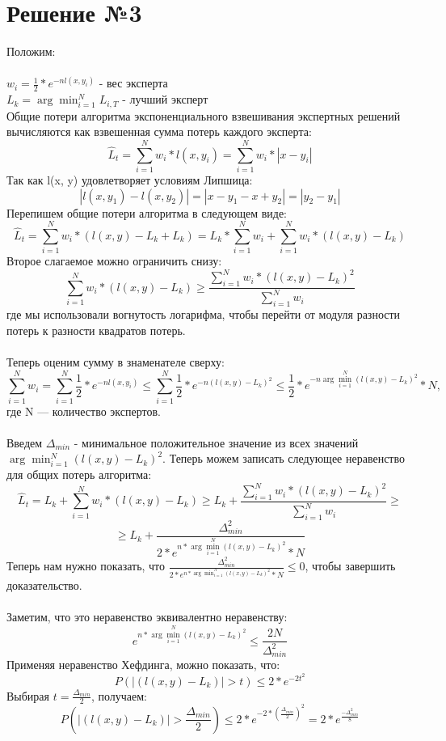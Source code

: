 \documentclass{article}
\begin{document}
\section{Решение №3}

Положим: \\\\
$w_i=\frac{1}{2}*e^{-nl(x,y_i)}$ - вес эксперта \\
$L_k = \arg\min_{i=1}^N L_{i,T}$ - лучший эксперт \\

Общие потери алгоритма экспоненциального взвешивания экспертных решений вычисляются как взвешенная сумма потерь каждого эксперта:
$$
\hat{L}_t = \sum_{i=1}^N w_i*l(x,y_i) = \sum_{i=1}^N w_i*|x-y_i|
$$
Так как l(x, y) удовлетворяет условиям Липшица:
$$
|l(x,y_1)-l(x,y_2)| = |x-y_1-x+y_2| = |y_2-y_1|
$$
Перепишем общие потери алгоритма в следующем виде:
$$
\hat{L}_t = \sum_{i=1}^N w_i*(l(x,y)-L_k+L_k) = L_k*\sum_{i=1}^N w_i+\sum_{i=1}^N w_i*(l(x,y)-L_k)
$$
Второе слагаемое можно ограничить снизу:
$$
\sum_{i=1}^N w_i*(l(x,y)-L_k) \geq \frac{\sum_{i=1}^N w_i*(l(x,y)-L_k)^2}{\sum_{i=1}^N w_i}
$$
где мы использовали вогнутость логарифма, чтобы перейти от модуля разности потерь к разности квадратов потерь. \\\\
Теперь оценим сумму в знаменателе сверху:
$$
\sum_{i=1}^N w_i=\sum_{i=1}^N \frac{1}{2}*e^{-nl(x,y_i)}
\leq \sum_{i=1}^N \frac{1}{2}*e^{-n(l(x,y)-L_k)^2}
\leq \frac{1}{2}*e^{-n\arg\min_{i=1}^N (l(x,y)-L_k)^2}*N,
$$
где N — количество экспертов.\\\\
Введем $\Delta_{min}$ - минимальное положительное значение из всех значений $\arg\min_{i=1}^N (l(x,y)-L_k)^2$.
Теперь можем записать следующее неравенство для общих потерь алгоритма:
$$
\hat{L}_t = L_k + \sum_{i=1}^N w_i * (l(x,y)-L_k) \geq L_k + \frac{\sum_{i=1}^N w_i * (l(x,y)-L_k)^2}{\sum_{i=1}^N w_i} \geq
$$
$$
\geq L_k + \frac{\Delta_{min}^2}{2 * e^{n * \arg\min_{i=1}^N (l(x,y)-L_k)^2} * N}
$$
Теперь нам нужно показать, что $\frac{\Delta_{min}^2}{2 * e^{n * \arg\min_{i=1}^N (l(x,y)-L_k)^2} * N} \leq 0$, чтобы завершить доказательство. \\\\
Заметим, что это неравенство эквивалентно неравенству:
$$
e^{n * \arg\min_{i=1}^N (l(x,y)-L_k)^2} \leq \frac{2N}{\Delta_{min}^2}
$$
Применяя неравенство Хефдинга, можно показать, что:
$$
P(|(l(x,y)-L_k)| > t) \leq 2 * e^{-2t^2}
$$
Выбирая $t = \frac{\Delta_{min}}{2}$, получаем:
$$
P(|(l(x,y)-L_k)| > \frac{\Delta_{min}}{2}) \leq 2 * e^{-2 * (\frac{\Delta_{min}}{2})^2} = 2 * e^{\frac{-\Delta_{min}^2}{8}}
$$
\end{document}
